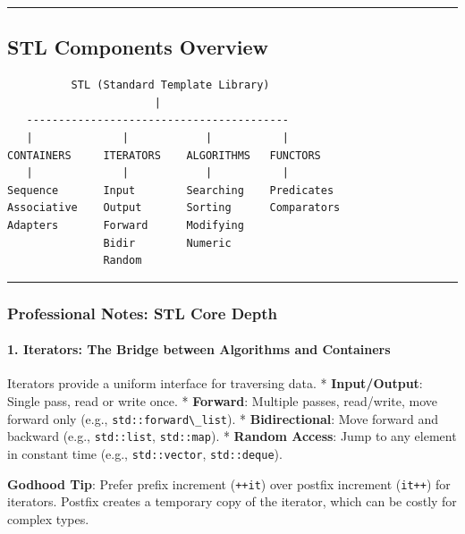 \begin{center}\rule{0.5\linewidth}{0.5pt}\end{center}

\hypertarget{stl-components-overview}{%
\subsection{STL Components Overview}\label{stl-components-overview}}

\begin{lstlisting}
          STL (Standard Template Library)
                       |
   -----------------------------------------
   |              |            |           |
CONTAINERS     ITERATORS    ALGORITHMS   FUNCTORS
   |              |            |           |
Sequence       Input        Searching    Predicates
Associative    Output       Sorting      Comparators
Adapters       Forward      Modifying
               Bidir        Numeric
               Random
\end{lstlisting}

\begin{center}\rule{0.5\linewidth}{0.5pt}\end{center}

\hypertarget{professional-notes-stl-core-depth}{%
\subsubsection{Professional Notes: STL Core
Depth}\label{professional-notes-stl-core-depth}}

\hypertarget{iterators-the-bridge-between-algorithms-and-containers}{%
\paragraph{1. Iterators: The Bridge between Algorithms and
Containers}\label{iterators-the-bridge-between-algorithms-and-containers}}

Iterators provide a uniform interface for traversing data. *
\textbf{Input/Output}: Single pass, read or write once. *
\textbf{Forward}: Multiple passes, read/write, move forward only (e.g.,
\passthrough{\lstinline!std::forward\_list!}). * \textbf{Bidirectional}:
Move forward and backward (e.g., \passthrough{\lstinline!std::list!},
\passthrough{\lstinline!std::map!}). * \textbf{Random Access}: Jump to
any element in constant time (e.g.,
\passthrough{\lstinline!std::vector!},
\passthrough{\lstinline!std::deque!}).

\textbf{Godhood Tip}: Prefer prefix increment
(\passthrough{\lstinline!++it!}) over postfix increment
(\passthrough{\lstinline!it++!}) for iterators. Postfix creates a
temporary copy of the iterator, which can be costly for complex types.

